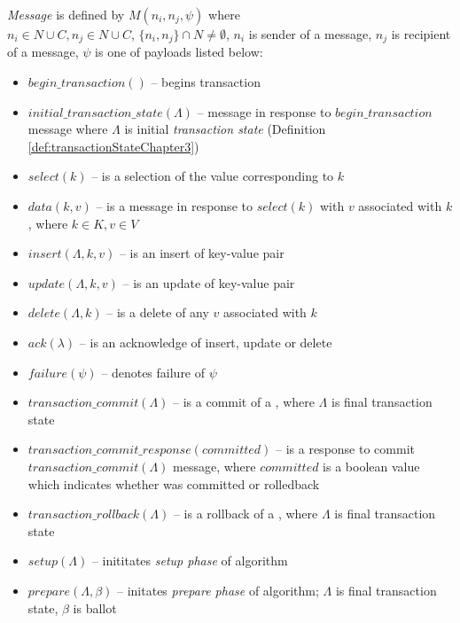 \begin{definition}
	\label{def:message}
	\emph{Message} is defined by $\mathit{M}(n_{i}, n_{j}, \psi)$ where 
	\\ $n_{i}\in\mathit{N}\cup\mathit{C}, n_{j}\in\mathit{N}\cup\mathit{C}$, $\{n_{i}, n_{j}\}\cap\mathit{N}\neq\emptyset$, $n_{i}$ is sender of a message, $n_{j}$ is recipient of a message, $\psi$ is one of payloads listed below:
	\begin{itemize}	
	\item $\mathit{begin\_transaction}()$ -- begins transaction \transaction 
	\item $\mathit{initial\_transaction\_state}(\Lambda)$ -- message in response to $\mathit{begin\_transaction}$ message where $\Lambda$ is initial \emph{transaction state} (Definition \ref{def:transactionStateChapter3}) 
	\item $\mathit{select(k)}$ -- is a selection of the value corresponding to $k$ 
	\item $\mathit{data(k,v)}$ -- is a message in response to $\mathit{select(k)}$ with $v$ associated with $k$, where $k\in\mathit{K}, v\in\mathit{V}$ 
	\item $\mathit{insert}(\Lambda,k,v)$ -- is an insert of key-value pair 
	\item $\mathit{update}(\Lambda,k,v)$ -- is an update of key-value pair 
	\item $\mathit{delete}(\Lambda,k)$ -- is a delete of any $v$ associated with $k$
	\item $\mathit{ack}(\lambda)$ -- is an acknowledge of insert, update or delete
	\item $\mathit{failure}(\psi)$ -- denotes failure of $\psi$
	\item $\mathit{transaction\_commit}(\Lambda)$ -- is a commit of a \transaction, where $\Lambda$ is final transaction state 
	\item $\mathit{transaction\_commit\_response}(committed)$ -- is a response to commit $\mathit{transaction\_commit}(\Lambda)$ message, where $committed$ is a boolean value which indicates whether \transaction was committed or rolledback
	\item $\mathit{transaction\_rollback}(\Lambda)$ -- is a rollback of a \transaction, where $\Lambda$ is final transaction state 
	\item $\mathit{setup}(\Lambda)$ -- inititates \emph{setup phase} of \mpt algorithm 
	\item $\mathit{prepare}(\Lambda, \beta)$ -- initates \emph{prepare phase} of \mpt algorithm; $\Lambda$ is final transaction state, $\beta$ is \paxos ballot 

\end{itemize}
\end{definition}

